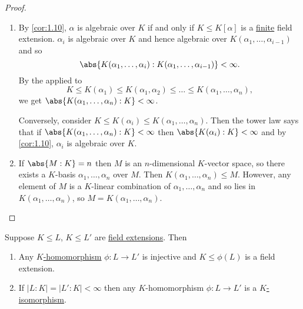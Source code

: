 \documentclass{article}
\begin{document}
\begin{proof} \leavevmode
    \begin{enumerate}[label=(\roman*)]
        \item By \cref{cor:1.10}, $\alpha$ is algebraic over $K$ if and only if $K \leq K[\alpha]$ is a \hyperlink{def:degreeOfFieldExt}{finite} field extension.
            $\alpha_i$ is algebraic over $K$ and hence algebraic over $K(\alpha_1, \dotsc, \alpha_{i-1})$ and so
            \begin{equation*}\abs{K(\alpha_1, \dotsc, \alpha_i):K(\alpha_1, \dotsc, \alpha_{i-1})} < \infty.\end{equation*}
            By the  applied to
            \begin{equation*}K \leq K(\alpha_1) \leq K(\alpha_1, \alpha_2) \leq \dots \leq K(\alpha_1, \dotsc, \alpha_n),\end{equation*} we get $\abs{K(\alpha_1, \dotsc, \alpha_n):K} < \infty$.

            Conversely, consider $K \leq K(\alpha_i) \leq K(\alpha_1, \dotsc, \alpha_n)$.
            Then the tower law says that if $\abs{K(\alpha_1, \dotsc, \alpha_n): K} < \infty$ then $\abs{K(\alpha_i):K} < \infty$ and by \cref{cor:1.10}, $\alpha_i$ is algebraic over $K$.

        \item If $\abs{M:K} = n$ then $M$ is an $n$-dimensional $K$-vector space, so there exists a $K$-basis $\alpha_1, \dotsc, \alpha_n$ over $M$.
            Then $K(\alpha_1, \dotsc, \alpha_n) \leq M$.
            However, any element of $M$ is a $K$-linear combination of $\alpha_1, \dotsc, \alpha_n$ and so lies in $K(\alpha_1, \dotsc, \alpha_n)$, so $M = K(\alpha_1, \dotsc, \alpha_n)$. \qedhere
    \end{enumerate}
\end{proof}



\begin{nlemma}\label{lem:1.21}
    Suppose $K \leq L$, $K \leq L'$ are \hyperlink{def:fieldExt}{field extensions}. Then
    \begin{enumerate}[label=(\roman*)]
        \item Any \hyperlink{def:homo}{$K$-homomorphism} $\phi:L \to L'$ is injective and $K \leq \phi(L)$ is a field extension.
        \item If $|L:K| = |L':K| < \infty$ then any $K$-homomorphism $\phi:L \to L'$ is a \hyperlink{def:homo}{$K$-isomorphism}.
    \end{enumerate}
\end{nlemma}
\end{document}
